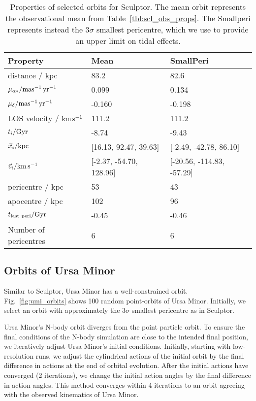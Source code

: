 \begin{table*}[t]
\centering
\caption[Sculptor Selected Orbits]{Properties of selected orbits for Sculptor. The mean orbit represents the observational mean from Table \ref{tbl:scl_obs_props}. The Smallperi represents instead the $3\sigma$ smallest pericentre, which we use to provide an upper limit on tidal effects. }
\label{tbl:scl_orbits}
\begin{tabular}{lll}
\toprule
Property & Mean & SmallPeri\\
\midrule
distance / kpc & 83.2 & 82.6\\
$\mu_{\alpha*} / {\rm mas^{-1}\,yr^{-1}}$ & 0.099 & 0.134\\
$\mu_{\delta} / {\rm mas^{-1}\,yr^{-1}}$ & -0.160 & -0.198\\
LOS velocity / ${\rm km\,s^{-1}}$ & 111.2 & 111.2\\
$t_i / {\rm Gyr}$ & -8.74 & -9.43\\
$\vec{x}_{i} / {\rm kpc}$ & [16.13, 92.47, 39.63] & [-2.49, -42.78, 86.10]\\
$\vec{v}_i / {\rm km\,s^{-1}}$ & [-2.37, -54.70, 128.96] & [-20.56, -114.83, -57.29]\\
pericentre / kpc & 53 & 43\\
apocentre / kpc & 102 & 96\\
$t_{\rm last\ peri} / {\rm Gyr}$ & -0.45 & -0.46\\
Number of pericentres & 6 & 6\\
\bottomrule
\end{tabular}
\end{table*}

\subsection{Orbits of Ursa Minor}\label{orbits-of-ursa-minor}

Similar to Sculptor, Ursa Minor has a well-constrained orbit.
Fig.~\ref{fig:umi_orbits} shows 100 random point-orbits of Ursa Minor.
Initially, we select an orbit with approximately the \(3\sigma\)
smallest pericentre as in Sculptor.

Ursa Minor's N-body orbit diverges from the point particle orbit. To
ensure the final conditions of the N-body simulation are close to the
intended final position, we iteratively adjust Ursa Minor's initial
conditions. Initially, starting with low-resolution runs, we adjust the
cylindrical actions of the initial orbit by the final difference in
actions at the end of orbital evolution. After the initial actions have
converged (2 iterations), we change the initial action angles by the
final difference in action angles. This method converges within 4
iterations to an orbit agreeing with the observed kinematics of Ursa
Minor.

